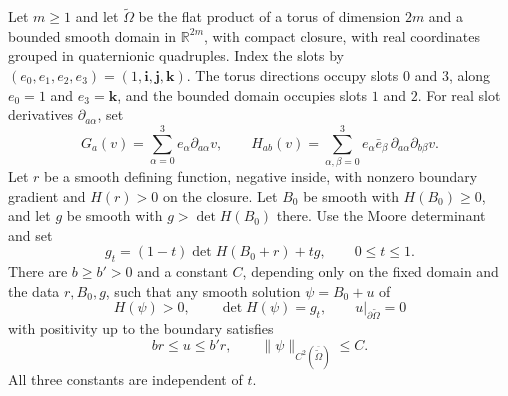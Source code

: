 Let $m\ge1$ and let $\widetilde\Omega$ be the flat product of a torus of dimension $2m$ and a bounded smooth domain in $\mathbb R^{2m}$, with compact closure, with real coordinates grouped in quaternionic quadruples. Index the slots by $(e_0,e_1,e_2,e_3)=(1,\mathbf i,\mathbf j,\mathbf k)$. The torus directions occupy slots $0$ and $3$, along $e_0=1$ and $e_3=\mathbf k$, and the bounded domain occupies slots $1$ and $2$. For real slot derivatives $\partial_{a\alpha}$, set
\[
G_a(v)=\sum_{\alpha=0}^3e_\alpha\partial_{a\alpha}v,\qquad
H_{ab}(v)=\sum_{\alpha,\beta=0}^3e_\alpha\bar e_\beta\,\partial_{a\alpha}\partial_{b\beta}v.
\]
Let $r$ be a smooth defining function, negative inside, with nonzero boundary gradient and $H(r)>0$ on the closure. Let $B_0$ be smooth with $H(B_0)\ge0$, and let $g$ be smooth with $g>\det H(B_0)$ there. Use the Moore determinant and set
\[
g_t=(1-t)\det H(B_0+r)+t g,\qquad 0\le t\le1 .
\]
There are $b\ge b'>0$ and a constant $C$, depending only on the fixed domain and the data $r,B_0,g$, such that any smooth solution $\psi=B_0+u$ of
\[
H(\psi)>0,\qquad \det H(\psi)=g_t,\qquad u|_{\partial\widetilde\Omega}=0
\]
with positivity up to the boundary satisfies
\[
br\le u\le b'r,\qquad \|\psi\|_{C^2(\overline{\widetilde\Omega})}\le C .
\]
All three constants are independent of $t$.
